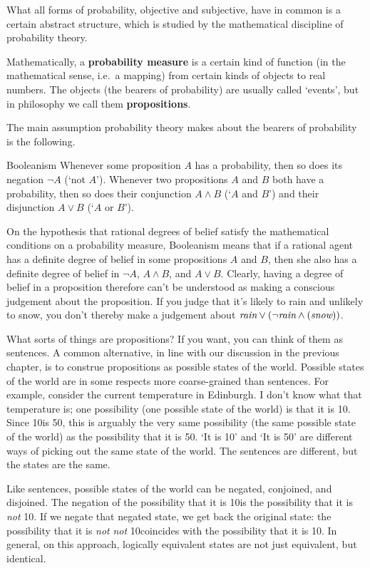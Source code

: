 What all forms of probability, objective and subjective, have in
common is a certain abstract structure, which is studied by the
mathematical discipline of probability theory.

Mathematically, a \textbf{probability measure} is a certain kind of
function (in the mathematical sense, i.e.\ a mapping) from certain
kinds of objects to real numbers. The objects (the bearers of
probability) are usually called `events', but in philosophy we call
them \textbf{propositions}.

The main assumption probability theory makes about the bearers of
probability is the following.
%
\begin{genericthm}{Booleanism}
  Whenever some proposition $A$ has a probability, then so does its
  negation $\neg A$ (`not $A$'). Whenever two propositions $A$ and $B$
  both have a probability, then so does their conjunction $A \land B$
  (`$A$ and $B$') and their disjunction $A \lor B$ (`$A$ or $B$').
\end{genericthm}
%
On the hypothesis that rational degrees of belief satisfy the
mathematical conditions on a probability measure, Booleanism means
that if a rational agent has a definite degree of belief in some
propositions $A$ and $B$, then she also has a definite degree of
belief in $\neg A$, $A \land B$, and $A \lor B$. Clearly, having a
degree of belief in a proposition therefore can't be understood as
making a conscious judgement about the proposition. If you judge that
it's likely to rain and unlikely to snow, you don't thereby make a
judgement about $\emph{rain} \lor (\neg \emph{rain} \land
(\emph{snow}))$. 


What sorts of things are propositions? If you want, you can think of
them as sentences. A common alternative, in line with our discussion
in the previous chapter, is to construe propositions as possible
states of the world. Possible states of the world are in some respects
more coarse-grained than sentences. For example, consider
the current temperature in Edinburgh. I don't know what that
temperature is; one possibility (one possible state of the world) is
that it is 10\celsius. Since 10\celsius is 50\fahrenheit, this is
arguably the very same possibility (the same possible state of the
world) as the possibility that it is 50\fahrenheit. `It is 10\celsius'
and `It is 50\fahrenheit' are different ways of picking out the same
state of the world. The sentences are different, but the states are
the same.

Like sentences, possible states of the world can be negated,
conjoined, and disjoined. The negation of the possibility that it is
10\celsius is the possibility that it is \emph{not} 10\celsius. If we
negate that negated state, we get back the original state: the
possibility that it is \emph{not} \emph{not} 10\celsius coincides with
the possibility that it is 10\celsius. In general, on this approach,
logically equivalent states are not just equivalent, but
identical. 

